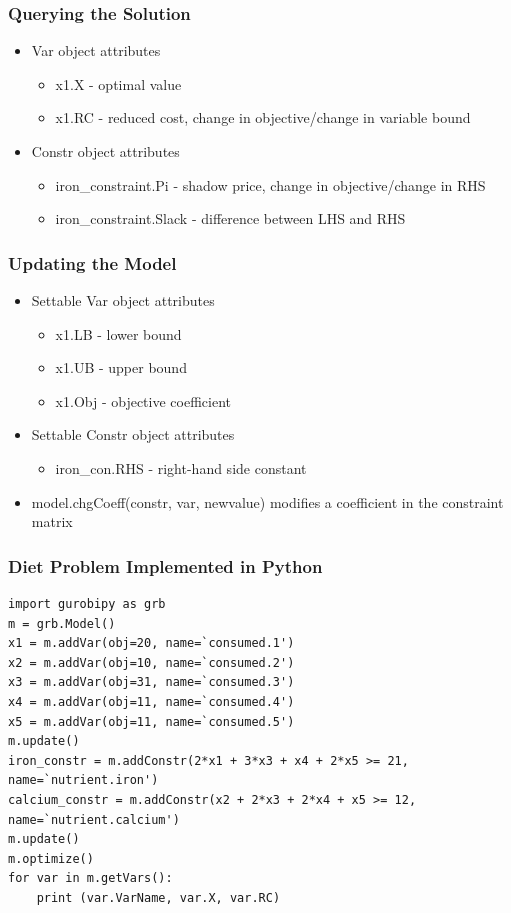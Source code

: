 \documentclass[12pt,handout]{beamer}
\begin{document}
\begin{frame}
\frametitle{Querying the Solution}
\begin{itemize}
\item Var object attributes
    \begin{itemize}
    \item x1.X - optimal value
    \item x1.RC - reduced cost, change in objective/change in variable bound
    \end{itemize}
\item Constr object attributes
    \begin{itemize}
    \item iron\_constraint.Pi - shadow price, change in objective/change in RHS
    \item iron\_constraint.Slack - difference between LHS and RHS
    \end{itemize}
\end{itemize}
\end{frame}

\begin{frame}
\frametitle{Updating the Model}
\begin{itemize}
\item Settable Var object attributes
    \begin{itemize}
    \item x1.LB - lower bound
    \item x1.UB - upper bound
    \item x1.Obj - objective coefficient
    \end{itemize}
\item Settable Constr object attributes
    \begin{itemize}
    \item iron\_con.RHS - right-hand side constant
    \end{itemize}
\item model.chgCoeff(constr, var, newvalue) modifies a coefficient in the constraint matrix
\end{itemize}
\end{frame}

\begin{frame} [containsverbatim]
\frametitle{Diet Problem Implemented in Python}
\scriptsize
\begin{verbatim}
import gurobipy as grb
m = grb.Model()
x1 = m.addVar(obj=20, name=`consumed.1')
x2 = m.addVar(obj=10, name=`consumed.2')
x3 = m.addVar(obj=31, name=`consumed.3')
x4 = m.addVar(obj=11, name=`consumed.4')
x5 = m.addVar(obj=11, name=`consumed.5')
m.update()
iron_constr = m.addConstr(2*x1 + 3*x3 + x4 + 2*x5 >= 21, name=`nutrient.iron')
calcium_constr = m.addConstr(x2 + 2*x3 + 2*x4 + x5 >= 12, name=`nutrient.calcium')
m.update()
m.optimize()
for var in m.getVars():
    print (var.VarName, var.X, var.RC)
\end{verbatim}
\end{frame}
\end{document}
